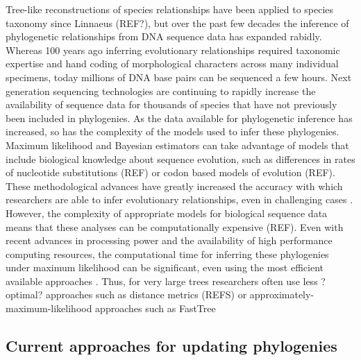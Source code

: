 \documentclass[10pt]{article}
\begin{document}
Tree-like reconstructions of species relationships have been applied to species taxonomy since Linnaeus (REF?), but over the past few decades the inference of phylogenetic relationships from DNA sequence data has expanded rabidly. 
Whereas 100 years ago inferring evolutionary relationships required taxonomic expertise and hand coding of morphological characters across many individual specimens, today millions of DNA base pairs can be sequenced a few hours. 
Next generation sequencing technologies are continuing to rapidly increase the availability of sequence data for thousands of species that have not previously been included in phylogenies. 
As the data available for phylogenetic inference has increased, so has the complexity of the models used to infer these phylogenies. 
Maximum likelihood and Bayesian estimators can take advantage of models that include biological knowledge about sequence evolution, such as differences in rates of nucleotide substitutions (REF) or codon based models of evolution (REF). 
These methodological advances have greatly increased the accuracy with which researchers are able to infer evolutionary relationships, even in challenging cases \cite{kuhner_simulation_1994}. 
However, the complexity of appropriate models for biological sequence data means that these analyses can be computationally expensive (REF). 
Even with recent advances in processing power and the availability of high performance computing resources, the computational time for inferring these phylogenies under maximum likelihood can be significant, even using the most efficient available approaches \cite{stamatakis_RAxML-VI-HPC:_2006}. 
 Thus, for very large trees researchers often use less ?optimal? approaches such as distance metrics (REFS) or approximately-maximum-likelihood approaches such as FastTree \cite{price_fasttree:_2009, price_fasttree_2010}


\subsection*{Current approaches for updating phylogenies}
\end{document}
